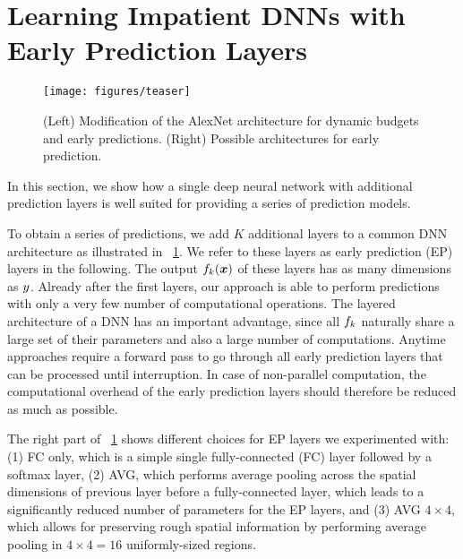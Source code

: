 \documentclass{bmvc2k}
\begin{document}
\section{Learning Impatient DNNs with Early Prediction Layers}
\label{sec:impatientcnns}

    \begin{figure}[tb]
        \centering
        \texttt{[image: figures/teaser]}
        \caption{(Left) Modification of the AlexNet architecture for dynamic budgets and early predictions. (Right) Possible architectures
        for early prediction.}
        \label{fig:architecture}
    \end{figure}

    In this section, we show how a single deep neural network
    with additional prediction layers is well suited for providing a series
    of prediction models.

    To obtain a series of predictions, we add
    $K$ additional layers to a common DNN architecture as
    illustrated in \figurename~\ref{fig:architecture}.
    We refer to these layers as early prediction (EP) layers in the following.
    The output $f_k(\bm{x})$ of these layers has as many dimensions as $y$.
    Already after the first layers, our approach is able to perform predictions
    with only a very few number of computational operations.
    The layered architecture of a DNN has an important advantage, since
    all $f_k$ naturally share a large set of their parameters and
    also a large number of computations.
    Anytime approaches
    require a forward pass to go through all
    early prediction layers that can be processed until interruption.
    In case of non-parallel computation, the computational
    overhead of the early prediction layers should therefore be reduced
    as much as possible.

    The right part of \figurename~\ref{fig:architecture}
    shows different choices for EP layers we experimented
    with: (1) FC only, which is a simple single fully-connected (FC) layer followed by a softmax layer,
    (2) AVG, which performs average pooling across the spatial dimensions of previous layer before
    a fully-connected layer, which leads to a significantly reduced number of parameters for the EP layers,
    and (3) AVG $4 \times 4$, which allows for preserving rough spatial information
    by performing average pooling in $4 \times 4 = 16$ uniformly-sized regions.
\end{document}
